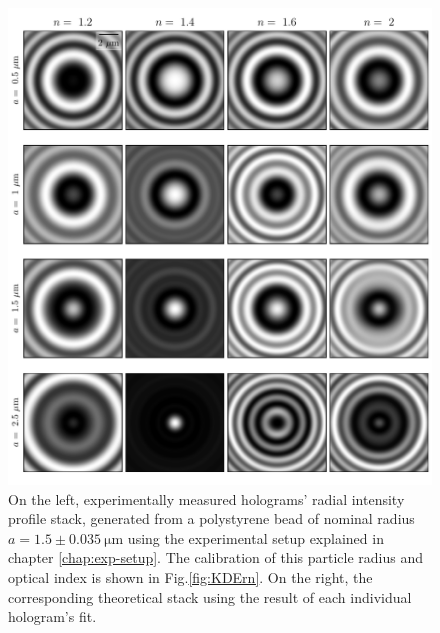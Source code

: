 \begin{figure}
	\centering
	\includegraphics{02_body/chapter2/images/holo_size_exemple/holos_fix_z.pdf}
	\caption{On the left, experimentally measured  holograms' radial intensity profile stack, generated from a polystyrene bead of nominal radius $a = 1.5 \pm 0.035 ~ \mathrm{\mu m} $ using the experimental setup explained in chapter \ref{chap:exp-setup}. The calibration of this particle radius and optical index is shown in Fig.\ref{fig:KDErn}. On the right, the corresponding theoretical stack using the result of each individual hologram's fit.}
	\label{fig.holo_fix_z}
\end{figure}

